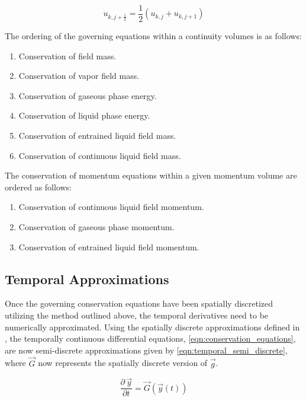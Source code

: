 \begin{equation}
\label{eqn:average_advecting_vel}
u_{k,j+\frac{1}{2}} = \frac{1}{2}\left(u_{k,j} + u_{k, j+1}\right)
\end{equation}

The ordering of the governing equations within a continuity volumes is as follows:

\begin{enumerate}
\item{Conservation of \ncg{} field mass.}
\item{Conservation of vapor field mass.}
\item{Conservation of gaseous phase energy.}
\item{Conservation of liquid phase energy.}
\item{Conservation of entrained liquid field mass.}
\item{Conservation of continuous liquid field mass.}
\end{enumerate}

The conservation of momentum equations within a given momentum volume are ordered as follows:

\begin{enumerate}
\item{Conservation of continuous liquid field momentum.}
\item{Conservation of gaseous phase momentum.}
\item{Conservation of entrained liquid field momentum.}
\end{enumerate}

\subsection{Temporal Approximations}
\label{subsect:temporal_approx}
Once the governing conservation equations have been spatially discretized utilizing the method outlined above, the temporal derivatives need to be numerically approximated.
Using the spatially discrete approximations defined in , the temporally continuous differential equations, \eqref{eqn:conservation_equations}, are now semi-discrete approximations given by \eqref{eqn:temporal_semi_discrete}, where $\vec{G}$ now represents the spatially discrete version of $\vec{g}$.

\begin{equation}
\label{eqn:temporal_semi_discrete}
\frac{\partial \,\vec{y} }{\partial t} = \vec{G}(\vec{y}(t))
\end{equation}

